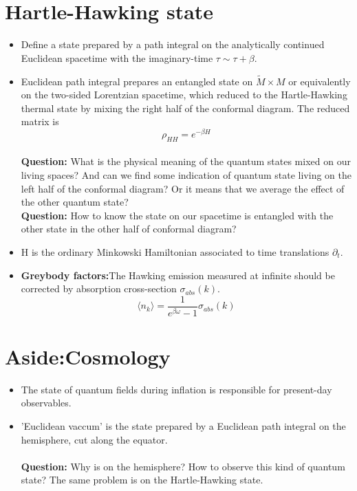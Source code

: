 \documentclass{article}
\def\beq{\begin{eqnarray}}
\def\eeq{\end{eqnarray}}
\def\beq{\begin{equation}}
\def\eeq{\end{equation}}
\begin{document}
\section{Hartle-Hawking state}
\begin{itemize}
\item{ Define a state prepared by a path integral on the analytically continued Euclidean spacetime with the imaginary-time $\tau\sim\tau+\beta$.     }
\item{Euclidean path integral prepares an entangled state on $\tilde{M}\times M$ or equivalently on the two-sided Lorentzian spacetime, which reduced to the Hartle-Hawking thermal state by mixing the right half of the conformal diagram. The reduced matrix is
    \beq
    \rho_{HH}=e^{-\beta H}
    \eeq}\\
    \textbf{Question:} What is the physical meaning of the quantum states mixed on our living spaces? And can we find some indication of quantum state living on the left half of the conformal diagram? Or it means that we average the effect of the other quantum state?\\
\textbf{Question:} How to know the state on our spacetime is entangled with the other state in the other half of conformal diagram?
\item{H is the ordinary Minkowski Hamiltonian associated to time translations $\partial_{t}$.}
\item{\textbf{Greybody factors:}The Hawking emission measured at infinite should be corrected by absorption cross-section $\sigma_{abs}(k)$.
\beq
\langle
n_{k}
\rangle=\frac{1}{e^{\beta\omega}-1}\sigma_{abs}(k)
\eeq}
\end{itemize}
\section{Aside:Cosmology}
\begin{itemize}
\item{The state of quantum fields during inflation is responsible for present-day observables. }
\item{'Euclidean vaccum' is the state prepared by a Euclidean path integral on the hemisphere, cut along the equator.}\\~~\\
\textbf{Question:} Why is on the hemisphere? How to observe this kind of quantum state? The same problem is on the Hartle-Hawking state.
\end{itemize}
\end{document}
